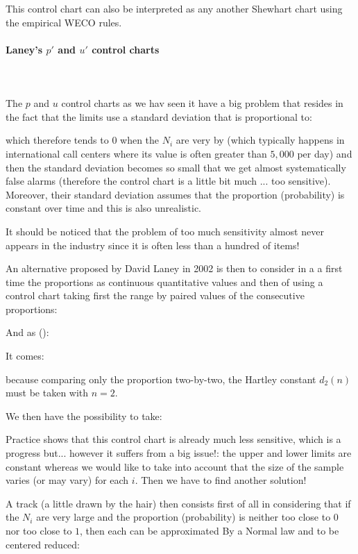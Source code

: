 	This control chart can also be interpreted as any another Shewhart chart using the empirical WECO rules.
	
	\paragraph{Laney's $p'$ and $u'$ control charts}\mbox{}\\\\
	The $p$ and $u$ control charts as we hav seen it have a big problem that resides in the fact that the limits use a standard deviation that is proportional to:
	
	which therefore tends to $0$ when the $N_i$ are very by (which typically happens in international call centers where its value is often greater than $5,000$ per day) and then the standard deviation becomes so small that we get almost systematically false alarms (therefore the control chart is a little bit much ... too sensitive). Moreover, their standard deviation assumes that the proportion (probability) is constant over time and this is also unrealistic.

	It should be noticed that the problem of too much sensitivity almost never appears in the industry since it is often less than a hundred of items!

	An alternative proposed by David Laney in 2002 is then to consider in a a first time the proportions as continuous quantitative values and then of using a control chart taking first the range by paired values of the consecutive proportions:
	
	And as ():
	
	It comes:
	
 	because comparing only the proportion two-by-two, the Hartley constant $d_2(n)$ must be taken with $n=2$.

	We then have the possibility to take:
	
	Practice shows that this control chart is already much less sensitive, which is a progress but... however it suffers from a big issue!: the upper and lower limits are constant whereas we would like to take into account that the size of the sample varies (or may vary) for each $i$. Then we have to find another solution!
	
	A track (a little drawn by the hair) then consists first of all in considering that if the $N_i$ are very large and the proportion (probability) is neither too close to $0$ nor too close to $1$, then each can be approximated By a Normal law and to be centered reduced:
	
